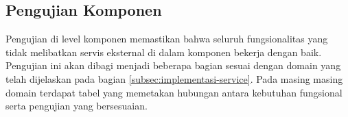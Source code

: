 \subsection{Pengujian Komponen}
Pengujian di level komponen memastikan bahwa seluruh fungsionalitas yang tidak melibatkan servis eksternal di dalam komponen bekerja dengan baik. Pengujian ini akan dibagi menjadi beberapa bagian sesuai dengan domain yang telah dijelaskan pada bagian \ref{subsec:implementasi-service}. Pada masing masing domain terdapat tabel yang memetakan hubungan antara kebutuhan fungsional serta pengujian yang bersesuaian.






